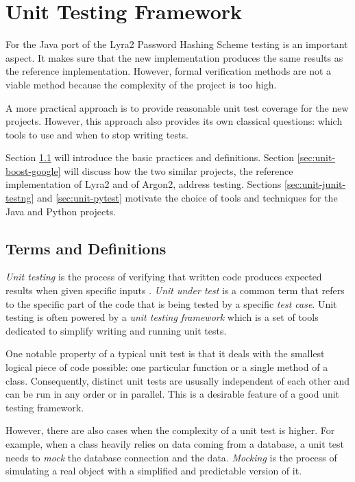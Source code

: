 \chapter{Unit Testing Framework}
\label{chapter:unit-testing-framework}

For the Java port of the Lyra2 Password Hashing Scheme testing is an important aspect. It makes sure that the new implementation produces the same results as the reference implementation. However, formal verification methods are not a viable method because the complexity of the project is too high.

A more practical approach is to provide reasonable unit test coverage for the new projects. However, this approach also provides its own classical questions: which tools to use and when to stop writing tests.

Section \ref{sec:unit-terms-and-definitions} will introduce the basic practices and definitions. Section \ref{sec:unit-boost-google} will discuss how the two similar projects, the reference implementation of Lyra2 and of Argon2, address testing. Sections \ref{sec:unit-junit-testng} and \ref{sec:unit-pytest} motivate the choice of tools and techniques for the Java and Python projects.

\section{Terms and Definitions}
\label{sec:unit-terms-and-definitions}

\emph{Unit testing} is the process of verifying that written code produces expected results when given specific inputs \cite{wiki:2017:unit-testing}. \emph{Unit under test} is a common term that refers to the specific part of the code that is being tested by a specific \emph{test case}. Unit testing is often powered by a \emph{unit testing framework} which is a set of tools dedicated to simplify writing and running unit tests.

One notable property of a typical unit test is that it deals with the smallest logical piece of code possible: one particular function or a single method of a class. Consequently, distinct unit tests are ususally independent of each other and can be run in any order or in parallel. This is a desirable feature of a good unit testing framework.

However, there are also cases when the complexity of a unit test is higher. For example, when a class heavily relies on data coming from a database, a unit test needs to \emph{mock} the database connection and the data. \emph{Mocking} is the process of simulating a real object with a simplified and predictable version of it.

